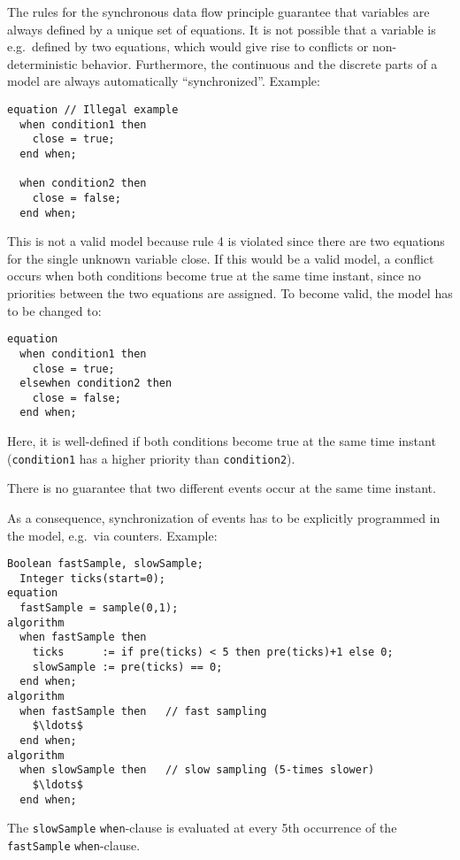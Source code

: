 \begin{nonnormative}
The rules for the synchronous data flow principle guarantee that variables are always defined by a unique set of equations.
It is not possible that a variable is e.g.\ defined by two equations, which would give rise to conflicts or non-deterministic behavior.
Furthermore, the continuous and the discrete parts of a model are always automatically ``synchronized''.
Example:
\begin{lstlisting}[language=modelica]
equation // Illegal example
  when condition1 then
    close = true;
  end when;

  when condition2 then
    close = false;
  end when;
\end{lstlisting}

This is not a valid model because rule 4 is violated since there are two equations for the single unknown variable close.
If this would be a valid model, a conflict occurs when both conditions become true at the same time instant, since no priorities between the two equations are assigned.
To become valid, the model has to be changed to:
\begin{lstlisting}[language=modelica]
equation
  when condition1 then
    close = true;
  elsewhen condition2 then
    close = false;
  end when;
\end{lstlisting}

Here, it is well-defined if both conditions become true at the same time instant (\lstinline!condition1! has a higher priority than \lstinline!condition2!).
\end{nonnormative}

There is no guarantee that two different events occur at the same time instant.

\begin{nonnormative}
As a consequence, synchronization of events has to be explicitly programmed in the model, e.g.\ via counters.
Example:
\begin{lstlisting}[language=modelica]
  Boolean fastSample, slowSample;
  Integer ticks(start=0);
equation
  fastSample = sample(0,1);
algorithm
  when fastSample then
    ticks      := if pre(ticks) < 5 then pre(ticks)+1 else 0;
    slowSample := pre(ticks) == 0;
  end when;
algorithm
  when fastSample then   // fast sampling
    $\ldots$
  end when;
algorithm
  when slowSample then   // slow sampling (5-times slower)
    $\ldots$
  end when;
\end{lstlisting}

The \lstinline!slowSample! \lstinline!when!-clause is evaluated at every 5th occurrence of the \lstinline!fastSample! \lstinline!when!-clause.
\end{nonnormative}

